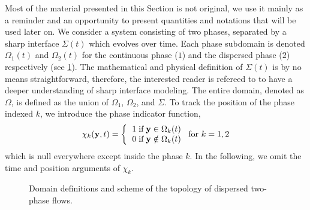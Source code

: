 Most of the material presented in this Section is not original, we use it mainly as
a reminder and an opportunity to present quantities and notations that will be
used later on.
We consider a system consisting of two phases, separated by a sharp interface $\Sigma(t)$ which evolves over time. 
Each phase subdomain is denoted $\Omega_1(t)$ and $\Omega_2(t)$ for the continuous phase ($1$) and the dispersed phase ($2$) respectively (see \ref{fig:Scheme}). 
The mathematical and physical definition of $\Sigma(t)$ is by no means straightforward, therefore, the interested reader is refereed to \cite{bothe2022sharp} to have a deeper understanding of sharp interface modeling. 
The entire domain, denoted as $\Omega$, is defined as the union of $\Omega_1$, $\Omega_2$, and $\Sigma$.
To track the position of the phase indexed $k$, we introduce the phase indicator function, 
\begin{equation}
    \chi_k(\textbf{y},t) =  \left\{
      \begin{tabular}{cc}
        $1 \;\text{if} \;\textbf{y} \in \Omega_k(t)$\\
        $0 \;\text{if} \;\textbf{y} \notin \Omega_k(t)$
      \end{tabular}
      \right.
      \text{for $k = 1,2$}
      \label{eq:PIF}
\end{equation}
which is null everywhere except inside the phase $k$. 
In the following, we omit the time and position arguments of $\chi_k$. 
\begin{figure}[h!]
    \centering
    \caption{Domain definitions and scheme of the topology of dispersed two-phase flows.}
    \label{fig:Scheme}
\end{figure}

